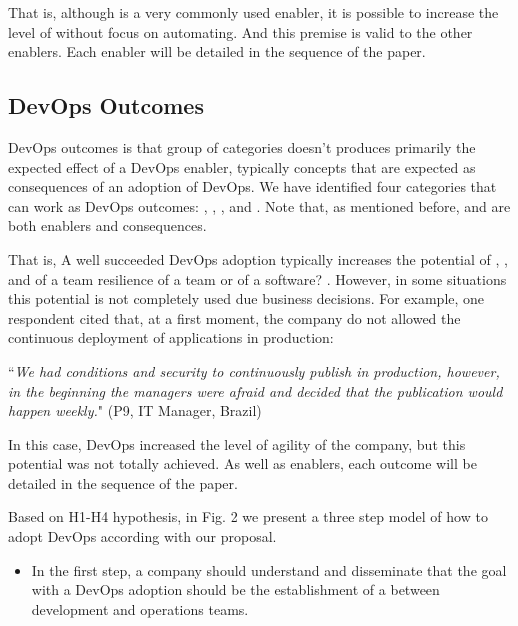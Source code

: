 {That is, although  is a very commonly used enabler, it is possible to
increase the level of  without focus on automating. And
this premise is valid to the other enablers. {\color{red}Each enabler will be detailed in
the sequence of the paper}.

\subsection{DevOps Outcomes}

DevOps outcomes is that group of categories doesn't produces primarily the
expected effect of a DevOps enabler, typically concepts that are expected as
consequences of an adoption of DevOps. We have identified four categories that
can work as DevOps outcomes: , ,
, and . Note that,
as mentioned before,  and 
are both enablers and consequences.

That is, A well succeeded DevOps adoption typically increases the potential of
, ,  and
 of a team {\color{red}resilience of a team or of a software?} .
However, in some situations this potential is not completely used due business
decisions. For example, one respondent cited that, at a first moment, the
company do not allowed the continuous deployment of applications in production:

\begin{mq}
``\emph{We had conditions and security to continuously publish in production,
however, in the beginning the managers were afraid and decided that the
publication would happen weekly.}" (P9, IT Manager, Brazil)
\end{mq}

In this case, DevOps increased the level of agility of the company, but this
potential was not totally achieved. As well as enablers, each outcome
will be detailed in the sequence of the paper.

Based on H1-H4 hypothesis, in Fig. 2 we present a three step model of how to
adopt DevOps according with our proposal.

\begin{itemize}
\item In the first step, a company should  understand and
disseminate that the goal with a DevOps adoption should be
the establishment of a  between
development and operations teams.


\end{itemize}}
